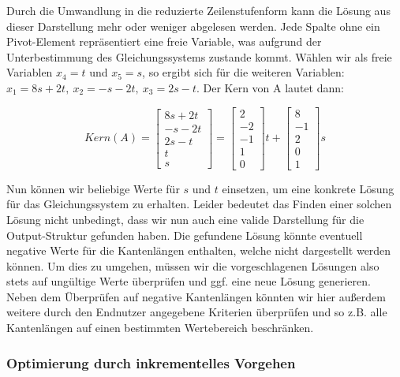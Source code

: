 Durch die Umwandlung in die reduzierte Zeilenstufenform kann die Lösung aus dieser Darstellung mehr oder weniger abgelesen werden. Jede Spalte ohne ein Pivot-Element
repräsentiert eine freie Variable, was aufgrund der Unterbestimmung des Gleichungssystems zustande kommt. Wählen wir als freie Variablen \(x_4 = t\) und
\(x_5 = s\), so ergibt sich für die weiteren Variablen: \(x_1 = 8s + 2t, \ x_2 = -s - 2t, \ x_3 = 2s - t\). Der Kern von A lautet dann:

\[
Kern(A) =
\begin{bmatrix}
    8s + 2t \\
    -s - 2t \\
    2s - t \\
    t \\
    s
\end{bmatrix}
=
\begin{bmatrix}
    2 \\ -2 \\ -1 \\ 1 \\ 0
\end{bmatrix}
t +
\begin{bmatrix}
    8 \\ -1 \\ 2 \\ 0 \\ 1
\end{bmatrix}
s
\]

Nun können wir beliebige Werte für \(s\) und \(t\) einsetzen, um eine konkrete Lösung für das Gleichungssystem zu erhalten. Leider bedeutet das Finden einer solchen
Lösung nicht unbedingt, dass wir nun auch eine valide Darstellung für die Output-Struktur gefunden haben. Die gefundene Lösung könnte eventuell negative Werte für
die Kantenlängen enthalten, welche nicht dargestellt werden können. Um dies zu umgehen, müssen wir die vorgeschlagenen Lösungen also stets auf ungültige Werte überprüfen
und ggf. eine neue Lösung generieren. Neben dem Überprüfen auf negative Kantenlängen könnten wir hier außerdem weitere durch den Endnutzer angegebene Kriterien überprüfen
und so z.B. alle Kantenlängen auf einen bestimmten Wertebereich beschränken.

\subsubsection{Optimierung durch inkrementelles Vorgehen}

